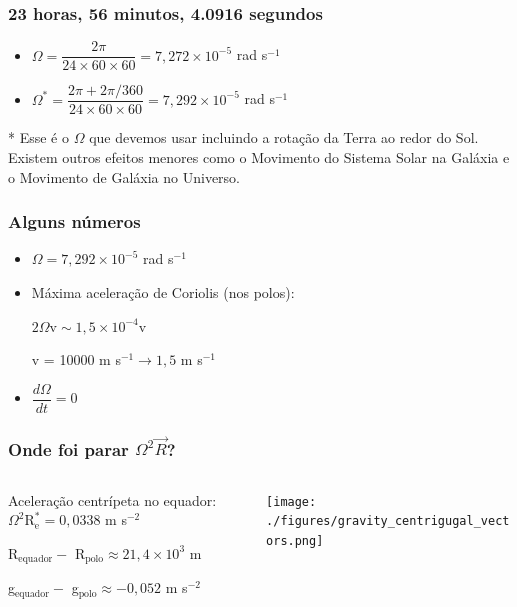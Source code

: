 \begin{frame}
  \frametitle{23 horas, 56 minutos, 4.0916 segundos}
  \begin{itemize}[<+-| alert@+>]
    \item $\Omega = \dfrac{2\pi} {24 \times 60 \times 60} =
           7,272 \times 10^{-5}$ rad s$^{-1}$
    \item $\Omega^* = \dfrac{2\pi + 2\pi/360} {24 \times 60 \times 60} =
           7,292 \times 10^{-5}$ rad s$^{-1}$
  \end{itemize}
  \pause
  \small{* Esse é o $\Omega$ que devemos usar incluindo a rotação da Terra ao
         redor do Sol.  Existem outros efeitos menores como o Movimento do
         Sistema Solar na Galáxia e o Movimento de Galáxia no Universo.}
\end{frame}

\begin{frame}
  \frametitle{Alguns números}
  \begin{itemize}[<+-| alert@+>]
    \item $\Omega = 7,292 \times 10^{-5}$ rad s$^{-1}$
    \item Máxima aceleração de Coriolis (nos polos):

        $2\Omega \text{v} \sim 1,5 \times 10^{-4}\text{v}$

        v = 10000 m s$^{-1}  \rightarrow 1,5$ m s$^{-1}$
    \item $\dfrac{d\Omega}{dt} = 0$
  \end{itemize}
\end{frame}


\begin{frame}
  \frametitle{Onde foi parar $\Omega^2\vec{R}$?}

  \begin{columns}
    \begin{column}{0.5\textwidth}
    \small{
      Aceleração centrípeta no equador:
      $\Omega^2\text{R}_{\text{e}}^{*} = 0,0338$ m s$^{-2}$

      R$_{\text{equador}} -$ R$_{\text{polo}} \approx 21,4 \times 10^{3}$ m

      g$_{\text{equador}} -$ g$_{\text{polo}} \approx -0,052$ m s$^{-2}$
      }
    \end{column}
    \begin{column}{0.5\textwidth}
      \begin{center}
        \texttt{[image: ./figures/gravity\_centrigugal\_vectors.png]}
      \end{center}
    \end{column}
  \end{columns}
\end{frame}


